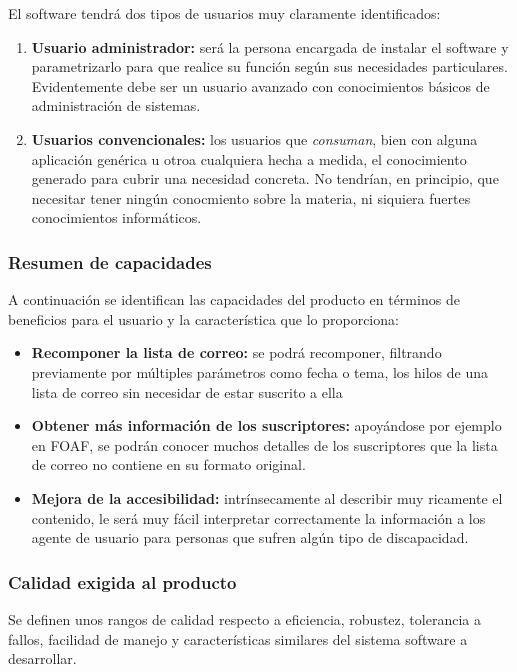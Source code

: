 El software tendrá dos tipos de usuarios muy claramente identificados:

\begin{enumerate}
  \item \textbf{Usuario administrador:} será la persona encargada de
	instalar el software y parametrizarlo para que realice su
	función según sus necesidades particulares. Evidentemente debe
	ser un usuario avanzado con conocimientos básicos de administración
	de sistemas.
  \item \textbf{Usuarios convencionales:} los usuarios que \emph{consuman},
	bien con alguna aplicación genérica u otroa cualquiera hecha a medida,
	el conocimiento generado para cubrir una necesidad concreta. No
	tendrían, en principio, que necesitar tener ningún conocmiento 
	sobre la materia, ni siquiera fuertes conocimientos informáticos.
\end{enumerate}

\subsubsection{Resumen de capacidades}

A continuación se identifican las capacidades del producto en términos de 
beneficios para el usuario y la característica que lo proporciona:

\begin{itemize}
  \item \textbf{Recomponer la lista de correo:} se podrá recomponer, filtrando 
	previamente por múltiples parámetros como fecha o tema, los hilos de una 
	lista de correo sin necesidar de estar suscrito a ella
  \item \textbf{Obtener más información de los suscriptores:} apoyándose por 
	ejemplo en FOAF, se podrán conocer muchos detalles de los suscriptores 
	que la lista de correo no contiene en su formato original.
  \item \textbf{Mejora de la accesibilidad:} intrínsecamente al describir muy 
	ricamente el contenido, le será muy fácil interpretar correctamente 
	la información a los agente de usuario para personas que sufren algún 
	tipo de discapacidad.
\end{itemize}

\subsubsection{Calidad exigida al producto}

Se definen unos rangos de calidad respecto a eficiencia, robustez, 
tolerancia a fallos, facilidad de manejo y características similares 
del sistema software a desarrollar.

